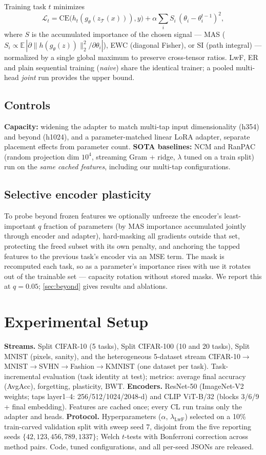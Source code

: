 \documentclass{article} %
\begin{document}
Training task $t$ minimizes
\begin{equation}
\mathcal{L}_t=\mathrm{CE}\big(h_t(g_\theta(z_\mathcal{T}(x))),y\big)
+\alpha\sum_{i} S_i\,(\theta_i-\theta_i^{t-1})^2,
\label{eq:penalty}
\end{equation}
where $S$ is the accumulated importance of the chosen signal --- MAS
($S_i\propto\mathbb{E}\,|\partial\|h(g_\theta(z))\|_2^2/\partial\theta_i|$),
EWC (diagonal Fisher), or SI (path integral) --- normalized by a single global
maximum to preserve cross-tensor ratios. LwF, ER and plain sequential training
(\emph{naive}) share the identical trainer; a pooled multi-head \emph{joint}
run provides the upper bound.

\subsection{Controls}
\textbf{Capacity:} widening the adapter to match multi-tap input
dimensionality (h354) and beyond (h1024), and a parameter-matched linear LoRA
adapter, separate placement effects from parameter count.
\textbf{SOTA baselines:} NCM and RanPAC (random projection dim
$10^4$, streaming Gram + ridge, $\lambda$ tuned on a train split) run on the
\emph{same cached features}, including our multi-tap configurations.

\subsection{Selective encoder plasticity}
\label{sec:method-sp}
To probe beyond frozen features we optionally unfreeze the encoder's
least-important $q$ fraction of parameters (by MAS importance accumulated
jointly through encoder and adapter), hard-masking all gradients outside that
set, protecting the freed subset with its own penalty, and anchoring the
tapped features to the previous task's encoder via an MSE term. The mask is
recomputed each task, so as a parameter's importance rises with use it rotates
out of the trainable set --- capacity rotation without stored masks. We report
this at $q{=}0.05$; \cref{sec:beyond} gives results and ablations.

\section{Experimental Setup}
\label{sec:setup}
\textbf{Streams.} Split CIFAR-10 (5 tasks), Split CIFAR-100 (10 and 20 tasks),
Split MNIST (pixels, sanity), and the heterogeneous 5-dataset stream
CIFAR-10$\to$MNIST$\to$SVHN$\to$Fashion$\to$KMNIST (one dataset per task).
Task-incremental evaluation (task identity at test); metrics: average final
accuracy (AvgAcc), forgetting, plasticity, BWT.
\textbf{Encoders.} ResNet-50 (ImageNet-V2 weights; taps layer1--4:
256/512/1024/2048-d) and CLIP ViT-B/32 (blocks 3/6/9 + final embedding).
Features are cached once; every CL run trains only the adapter and heads.
\textbf{Protocol.} Hyperparameters ($\alpha$, $\lambda_{\mathrm{LwF}}$)
selected on a 10\% train-carved validation split with sweep seed 7, disjoint
from the five reporting seeds $\{42,123,456,789,1337\}$; Welch $t$-tests with
Bonferroni correction across method pairs. Code, tuned configurations, and all
per-seed JSONs are released.
\end{document}
